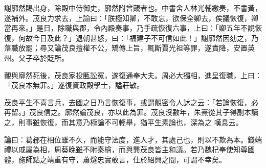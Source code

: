 \begin{pinyinscope}
 謝廓然賜出身，除殿中侍御史，廓然附曾覿者也。中書舍人林光輔繳奏，不書黃，遂補外。茂良力求去，上諭曰：「朕極知卿，不敢忘，欲保全卿去，俟議恢復，卿當再來。」是日，除職與郡，令內殿奏事，乃手疏恢復六事，上曰：「卿五年不說恢復，何故今日及此？」退朝甚怒，曰：「福建子不可信如此！」謝廓然因劾之，乃
 落職放罷；尋又論茂良擅權不公，矯傳上旨，輒斷賈光祖等罪，遂責降，安置英州。父子卒於貶所。



 覿與廓然死後，茂良家投匭訟冤，遂復通奉大夫。周必大獨相，進呈復職，上曰：「茂良本無罪。」遂復資政殿學士，謚莊敏。



 茂良平生不喜言兵，去國之日乃言恢復事，或謂覿密令人訹之云：「若論恢復，必再留。」茂良信之。廓然論茂良，亦以此為罪。茂良沒數年，朱熹從其子得副本讀之，則事雖恢復，而其意乃極論不可輕舉，猶平生素論也，深為之
 嘆息云。



 論曰：葛邲在相位雖不久，而能守法度，進人才，其處己也，則以不欺為本。錢端禮以戚屬為相，周葵晚雖不附秦檜，而與龔茂良皆主和議。若乃魏杞奉使知尊國體，施師點之靖重有守，蕭燧忠實敢言，仕於紹興之間，可謂不幸矣。



\end{pinyinscope}